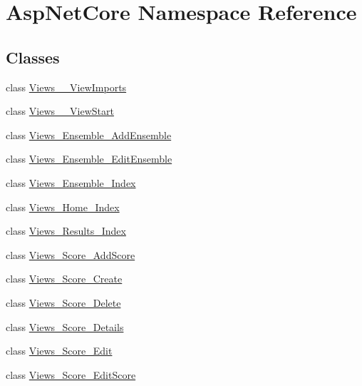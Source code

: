 \hypertarget{namespace_asp_net_core}{}\section{Asp\+Net\+Core Namespace Reference}
\label{namespace_asp_net_core}
\subsection*{Classes}
\begin{DoxyCompactItemize}
\item 
class \mbox{\hyperlink{class_asp_net_core_1_1_views_____view_imports}{Views\+\_\+\+\_\+\+View\+Imports}}
\item 
class \mbox{\hyperlink{class_asp_net_core_1_1_views_____view_start}{Views\+\_\+\+\_\+\+View\+Start}}
\item 
class \mbox{\hyperlink{class_asp_net_core_1_1_views___ensemble___add_ensemble}{Views\+\_\+\+Ensemble\+\_\+\+Add\+Ensemble}}
\item 
class \mbox{\hyperlink{class_asp_net_core_1_1_views___ensemble___edit_ensemble}{Views\+\_\+\+Ensemble\+\_\+\+Edit\+Ensemble}}
\item 
class \mbox{\hyperlink{class_asp_net_core_1_1_views___ensemble___index}{Views\+\_\+\+Ensemble\+\_\+\+Index}}
\item 
class \mbox{\hyperlink{class_asp_net_core_1_1_views___home___index}{Views\+\_\+\+Home\+\_\+\+Index}}
\item 
class \mbox{\hyperlink{class_asp_net_core_1_1_views___results___index}{Views\+\_\+\+Results\+\_\+\+Index}}
\item 
class \mbox{\hyperlink{class_asp_net_core_1_1_views___score___add_score}{Views\+\_\+\+Score\+\_\+\+Add\+Score}}
\item 
class \mbox{\hyperlink{class_asp_net_core_1_1_views___score___create}{Views\+\_\+\+Score\+\_\+\+Create}}
\item 
class \mbox{\hyperlink{class_asp_net_core_1_1_views___score___delete}{Views\+\_\+\+Score\+\_\+\+Delete}}
\item 
class \mbox{\hyperlink{class_asp_net_core_1_1_views___score___details}{Views\+\_\+\+Score\+\_\+\+Details}}
\item 
class \mbox{\hyperlink{class_asp_net_core_1_1_views___score___edit}{Views\+\_\+\+Score\+\_\+\+Edit}}
\item 
class \mbox{\hyperlink{class_asp_net_core_1_1_views___score___edit_score}{Views\+\_\+\+Score\+\_\+\+Edit\+Score}}
\item 

\end{DoxyCompactItemize}
